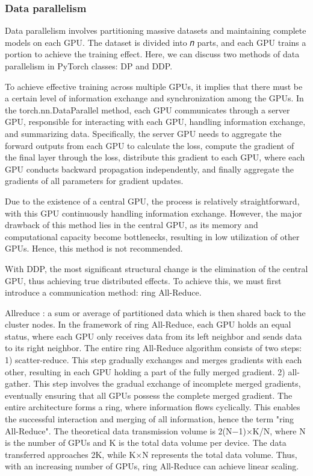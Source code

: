\documentclass[conference]{IEEEtran}
\begin{document}
\subsubsection{Data parallelism}
Data parallelism involves partitioning massive datasets and maintaining complete models on each GPU. The dataset is divided into 𝑛 parts, and each GPU trains a portion to achieve the training effect. Here, we can discuss two methods of data parallelism in PyTorch classes: DP and DDP.

To achieve effective training across multiple GPUs, it implies that there must be a certain level of information exchange and synchronization among the GPUs. In the torch.nn.DataParallel method, each GPU communicates through a server GPU, responsible for interacting with each GPU, handling information exchange, and summarizing data. Specifically, the server GPU needs to aggregate the forward outputs from each GPU to calculate the loss, compute the gradient of the final layer through the loss, distribute this gradient to each GPU, where each GPU conducts backward propagation independently, and finally aggregate the gradients of all parameters for gradient updates.

Due to the existence of a central GPU, the process is relatively straightforward, with this GPU continuously handling information exchange.
However, the major drawback of this method lies in the central GPU, as its memory and computational capacity become bottlenecks, resulting in low utilization of other GPUs. Hence, this method is not recommended.

With DDP, the most significant structural change is the elimination of the central GPU, thus achieving true distributed effects. To achieve this, we must first introduce a communication method: ring All-Reduce.

Allreduce \cite{b22} : a sum or average of partitioned data which is then shared back to the cluster nodes. In the framework of ring All-Reduce, each GPU holds an equal status, where each GPU only receives data from its left neighbor and sends data to its right neighbor. The entire ring All-Reduce algorithm consists of two steps:
1) scatter-reduce. This step gradually exchanges and merges gradients with each other, resulting in each GPU holding a part of the fully merged gradient. 2) all-gather. This step involves the gradual exchange of incomplete merged gradients, eventually ensuring that all GPUs possess the complete merged gradient.
The entire architecture forms a ring, where information flows cyclically. This enables the successful interaction and merging of all information, hence the term "ring All-Reduce". The theoretical data transmission volume is 2(N−1)×K/N​, where N is the number of GPUs and K is the total data volume per device. The data transferred approaches 2K, while K×N represents the total data volume. Thus, with an increasing number of GPUs, ring All-Reduce can achieve linear scaling.
\end{document}
